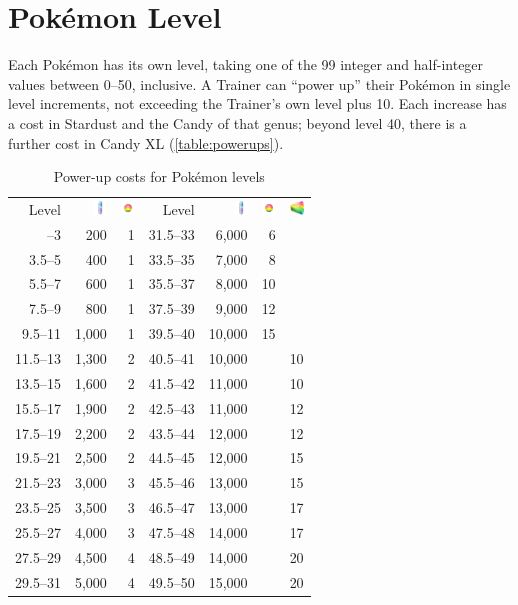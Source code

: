 \section{Pokémon Level\label{sec:plevel}}
Each Pokémon has its own level, taking one of the 99 integer and half-integer
 values between 0--50, inclusive.
A Trainer can ``power up'' their Pokémon in single level increments,
 not exceeding the Trainer's own level plus 10.
Each increase has a cost in Stardust and the Candy of that genus; beyond level 40, there
  is a further cost in Candy XL (\autoref{table:powerups}).
\begin{table}
\centering
\begin{tabular}[ht]{rrr|rrrr}
Level &
\includegraphics[width=1em,height=1em]{images/stardust.png} &
\includegraphics[width=1em,height=1em]{images/rarecandy.png} &
Level &
\includegraphics[width=1em,height=1em]{images/stardust.png} &
\includegraphics[width=1em,height=1em]{images/rarecandy.png} &
\includegraphics[width=1em,height=1em]{images/rarecandyxl.png} \\
\Midrule
1.5--3 &   200 & 1 & 31.5--33 &  6,000 &  6 & \\
3.5--5 &   400 & 1 & 33.5--35 &  7,000 &  8 & \\
5.5--7 &   600 & 1 & 35.5--37 &  8,000 & 10 & \\
7.5--9 &   800 & 1 & 37.5--39 &  9,000 & 12 & \\
9.5--11 & 1,000 & 1 & 39.5--40 & 10,000 & 15 & \\
11.5--13 & 1,300 & 2 & 40.5--41 & 10,000 &    & 10 \\
13.5--15 & 1,600 & 2 & 41.5--42 & 11,000 &    & 10 \\
15.5--17 & 1,900 & 2 & 42.5--43 & 11,000 &    & 12 \\
17.5--19 & 2,200 & 2 & 43.5--44 & 12,000 &    & 12 \\
19.5--21 & 2,500 & 2 & 44.5--45 & 12,000 &    & 15 \\
21.5--23 & 3,000 & 3 & 45.5--46 & 13,000 &    & 15 \\
23.5--25 & 3,500 & 3 & 46.5--47 & 13,000 &    & 17 \\
25.5--27 & 4,000 & 3 & 47.5--48 & 14,000 &    & 17 \\ 
27.5--29 & 4,500 & 4 & 48.5--49 & 14,000 &    & 20 \\
29.5--31 & 5,000 & 4 & 49.5--50 & 15,000 &    & 20 \\
\end{tabular}
\caption{Power-up costs for Pokémon levels\label{table:powerups}}
\end{table}
